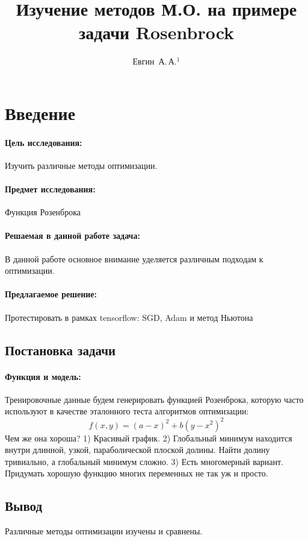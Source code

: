 \documentclass[12pt,twoside]{article}
\title
    [Изучение методов М.О. на примере задачи Rosenbrock]
    {Изучение методов М.О. на примере задачи Rosenbrock}
\author
    {Евгин~А.\,А.$^1$} %
\begin{document}
\maketitle

\section{Введение}
\paragraph{Цель исследования:}
Изучить различные методы оптимизации.
\paragraph{Предмет исследования:}
Функция Розенброка
\paragraph{Решаемая в данной работе задача:}
В данной работе основное внимание уделяется различным подходам к оптимизации.

\paragraph{Предлагаемое решение:}
Протестировать в рамках tensorflow: SGD, Adam и метод Ньютона

\subsection{Постановка задачи}
\paragraph{Функция и модель:}
Тренировочные данные будем генерировать функцией Розенброка, которую часто используют в качестве эталонного теста алгоритмов оптимизации:
\begin{equation}
f(x, y)=(a-x)^2+b(y-x^2)^2
\end{equation}
Чем же она хороша?
1) Красивый график.
2) Глобальный минимум находится внутри длинной, узкой, параболической плоской долины. Найти долину тривиально, а глобальный минимум сложно.
3) Есть многомерный вариант. Придумать хорошую функцию многих переменных не так уж и просто.

\subsection{Вывод}
Различные методы оптимизации изучены и сравнены.



\nocite{*}
\end{document}
